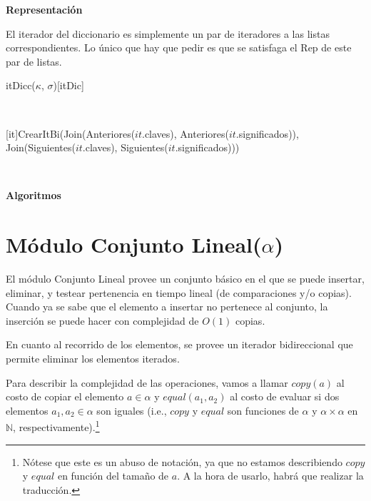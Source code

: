 \documentclass[a4paper,10pt]{article}
\newenvironment{Representacion}{%
  \vspace*{2ex}%
  \noindent\textbf{\Large Representación}%
  \vspace*{2ex}%
}{}
\newenvironment{Algoritmos}{%
  \vspace*{2ex}%
  \noindent\textbf{\Large Algoritmos}%
  \vspace*{2ex}%
}{}
\begin{document}
\begin{Representacion}
  El iterador del diccionario es simplemente un par de iteradores a las listas correspondientes.  Lo único que hay que pedir es que se satisfaga el Rep de este par de listas.

  \begin{Estructura}{itDicc($\kappa$, $\sigma$)}[itDic]
    \begin{Tupla}[itDic]%
    \end{Tupla}
  \end{Estructura}


  ~

  [it]{CrearItBi(Join(Anteriores($it$.claves), Anteriores($it$.significados)), \\\phantom{CrearItBi(}Join(Siguientes($it$.claves), Siguientes($it$.significados)))}\mbox{}

  ~


\end{Representacion}

\begin{Algoritmos}
  
\end{Algoritmos}

\section{Módulo Conjunto Lineal($\alpha$)}
\label{sec:ConjuntoLineal}

El módulo Conjunto Lineal provee un conjunto básico en el que se puede insertar, eliminar, y testear pertenencia en tiempo lineal (de comparaciones y/o copias).  Cuando ya se sabe que el elemento a insertar no pertenece al conjunto, la inserción se puede hacer con complejidad de $O(1)$ copias.

En cuanto al recorrido de los elementos, se provee un iterador bidireccional que permite eliminar los elementos iterados.  

Para describir la complejidad de las operaciones, vamos a llamar $copy(a)$ al costo de copiar el elemento $a \in \alpha$ y $equal(a_1, a_2)$ al costo de evaluar si dos elementos $a_1, a_2 \in \alpha$ son iguales (i.e., $copy$ y $equal$ son funciones de $\alpha$ y $\alpha \times \alpha$ en $\mathbb{N}$, respectivamente).\footnote{Nótese que este es un abuso de notación, ya que no estamos describiendo $copy$ y $equal$ en función del tamaño de $a$.  A la hora de usarlo, habrá que realizar la traducción.}
\end{document}
